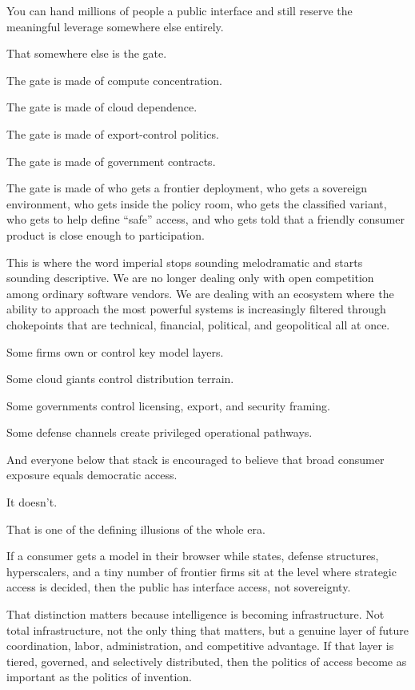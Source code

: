 \documentclass[
  american,
  12pt,
  letterpaper,
]{article}
\begin{document}
You can hand millions of people a public interface and still reserve the
meaningful leverage somewhere else entirely.

That somewhere else is the gate.

The gate is made of compute concentration.

The gate is made of cloud dependence.

The gate is made of export-control politics.

The gate is made of government contracts.

The gate is made of who gets a frontier deployment, who gets a sovereign
environment, who gets inside the policy room, who gets the classified
variant, who gets to help define ``safe'' access, and who gets told that
a friendly consumer product is close enough to participation.

This is where the word imperial stops sounding melodramatic and starts
sounding descriptive. We are no longer dealing only with open
competition among ordinary software vendors. We are dealing with an
ecosystem where the ability to approach the most powerful systems is
increasingly filtered through chokepoints that are technical, financial,
political, and geopolitical all at once.

Some firms own or control key model layers.

Some cloud giants control distribution terrain.

Some governments control licensing, export, and security framing.

Some defense channels create privileged operational pathways.

And everyone below that stack is encouraged to believe that broad
consumer exposure equals democratic access.

It doesn't.

That is one of the defining illusions of the whole era.

If a consumer gets a model in their browser while states, defense
structures, hyperscalers, and a tiny number of frontier firms sit at the
level where strategic access is decided, then the public has interface
access, not sovereignty.

That distinction matters because intelligence is becoming
infrastructure. Not total infrastructure, not the only thing that
matters, but a genuine layer of future coordination, labor,
administration, and competitive advantage. If that layer is tiered,
governed, and selectively distributed, then the politics of access
become as important as the politics of invention.
\end{document}

